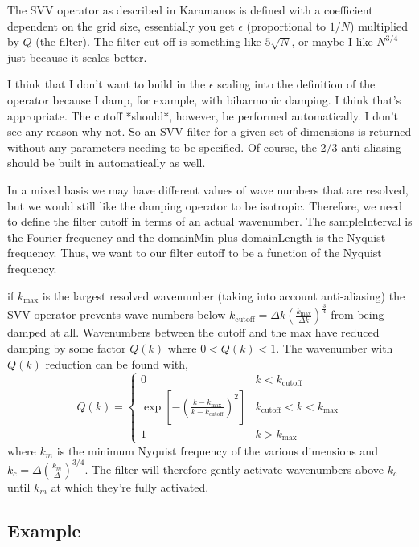 \documentclass[11pt]{article}
\begin{document}
The SVV operator as described in Karamanos is defined with a coefficient dependent on the grid size, essentially you get $\epsilon$ (proportional to $1/N$) multiplied by $Q$ (the filter). The filter cut off is something like $5\sqrt{N}$, or maybe I like $N^{3/4}$ just because it scales better.

I think that I don't want to build in the $\epsilon$ scaling into the definition of the operator because I damp, for example, with biharmonic damping. I think that's appropriate. The cutoff *should*, however, be performed automatically. I don't see any reason why not. So an SVV filter for a given set of dimensions is returned without any parameters needing to be specified. Of course, the 2/3 anti-aliasing should be built in automatically as well.

In a mixed basis we may have different values of wave numbers that are resolved, but we would still like the damping operator to be isotropic. Therefore, we need to define the filter cutoff in terms of an actual wavenumber. The sampleInterval is the Fourier frequency and the domainMin plus domainLength is the Nyquist frequency. Thus, we want to our filter cutoff to be a function of the Nyquist frequency.

if $k_{\textrm{max}}$ is the largest resolved wavenumber (taking into account anti-aliasing) the SVV operator prevents wave numbers below $k_{\textrm{cutoff}}=\Delta k \left(\frac{k_{\textrm{max}}}{\Delta k} \right)^{\frac{3}{4}}$ from being damped at all. Wavenumbers between the cutoff and the max have reduced damping by some factor $Q(k)$ where $0<Q(k)<1$. The wavenumber with $Q(k)$ reduction can be found with,
\begin{equation}
Q(k) = 
\begin{cases}
0 & k < k_{\textrm{cutoff}} \\
\exp \left[ - \left( \frac{k-k_{\textrm{max}}}{k-k_{\textrm{cutoff}}} \right)^2 \right] & k_{\textrm{cutoff}} < k < k_{\textrm{max}} \\
1 & k > k_{\textrm{max}}
\end{cases}
\end{equation}
where $k_m$ is the minimum Nyquist frequency of the various dimensions and $k_c = \Delta \left(\frac{k_m}{\Delta}\right)^{3/4}$. The filter will therefore gently activate wavenumbers above $k_c$ until $k_m$ at which they're fully activated.

\subsection{Example}
\end{document}
